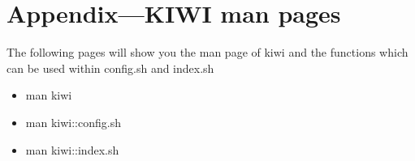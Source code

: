 \chapter{Appendix---KIWI man pages}
\label{chapter:Appendix}
\minitoc

The following pages will show you the man page of kiwi and the
functions which can be used within config.sh and index.sh

\begin{itemize}
  \item{man kiwi}
  \item{man kiwi::config.sh}
  \item{man kiwi::index.sh}
\end{itemize}
